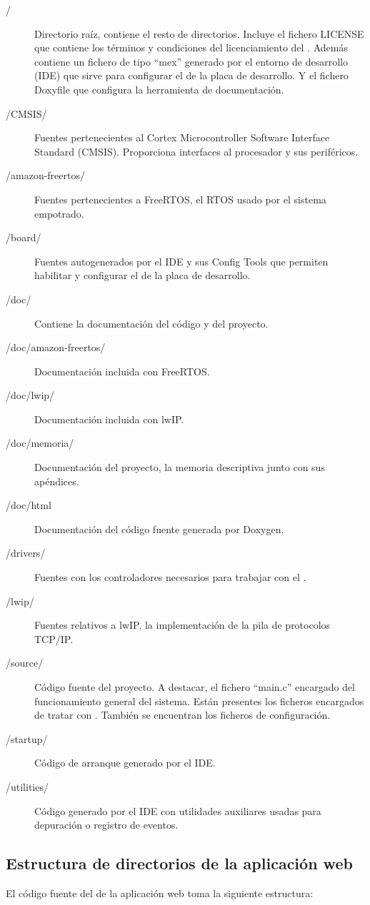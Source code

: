\begin{description}
  \item[/] Directorio raíz, contiene el resto de directorios. Incluye el
  fichero LICENSE que contiene los términos y condiciones del licenciamiento
  del \sw{}. Además contiene un fichero de tipo ``mex'' generado por el entorno
  de desarrollo (IDE) que sirve para configurar el \hw{} de la placa de
  desarrollo. Y el fichero Doxyfile que configura la herramienta de documentación.
  \item[/CMSIS/] Fuentes pertenecientes al Cortex Microcontroller Software
  Interface Standard (CMSIS). Proporciona interfaces al procesador y sus
  periféricos.
  \item[/amazon-freertos/] Fuentes pertenecientes a FreeRTOS, el RTOS usado por
  el sistema empotrado.
  \item[/board/] Fuentes autogenerados por el IDE y sus Config Tools que 
  permiten habilitar y configurar el \hw{} de la placa de desarrollo.
  \item[/doc/] Contiene la documentación del código y del proyecto.
  \item[/doc/amazon-freertos/] Documentación incluida con FreeRTOS.
  \item[/doc/lwip/] Documentación incluida con lwIP.
  \item[/doc/memoria/] Documentación del proyecto, la memoria descriptiva junto
  con sus apéndices.
  \item[/doc/html] Documentación del código fuente generada por Doxygen.
  \item[/drivers/] Fuentes con los controladores necesarios para trabajar con el
  \hw{}.
  \item[/lwip/] Fuentes relativos a lwIP, la implementación de la pila de 
  protocolos TCP/IP.
  \item[/source/] Código fuente del proyecto. A destacar, el fichero ``main.c''
  encargado del funcionamiento general del sistema. Están presentes los ficheros
  encargados de tratar con \hw{}. También se encuentran los ficheros de
  configuración.
  \item[/startup/] Código de arranque generado por el IDE.
  \item[/utilities/] Código generado por el IDE con utilidades auxiliares usadas
  para depuración o registro de eventos.
\end{description}


\subsection{Estructura de directorios de la aplicación web}
\label{sec:man-dev-struct-aw}
El código fuente del \sw{} de la aplicación web toma la siguiente estructura:

